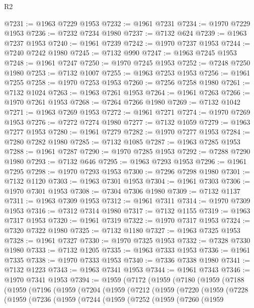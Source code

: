 \begin{lexlean}{R2}
\begin{coremodule}
@7231 := @1963 @7229 @1953
@7232 := @1961 @7231
@7234 := @1970 @7229 @1953
@7236 := @7232 @7234 @1980
@7237 := @7132 @624
@7239 := @1963 @7237 @1953
@7240 := @1961 @7239
@7242 := @1970 @7237 @1953
@7244 := @7240 @7242 @1980
@7245 := @7132 @990
@7247 := @1963 @7245 @1953
@7248 := @1961 @7247
@7250 := @1970 @7245 @1953
@7252 := @7248 @7250 @1980
@7253 := @7132 @1007
@7255 := @1963 @7253 @1953
@7256 := @1961 @7255
@7258 := @1970 @7253 @1953
@7260 := @7256 @7258 @1980
@7261 := @7132 @1024
@7263 := @1963 @7261 @1953
@7264 := @1961 @7263
@7266 := @1970 @7261 @1953
@7268 := @7264 @7266 @1980
@7269 := @7132 @1042
@7271 := @1963 @7269 @1953
@7272 := @1961 @7271
@7274 := @1970 @7269 @1953
@7276 := @7272 @7274 @1980
@7277 := @7132 @1059
@7279 := @1963 @7277 @1953
@7280 := @1961 @7279
@7282 := @1970 @7277 @1953
@7284 := @7280 @7282 @1980
@7285 := @7132 @1085
@7287 := @1963 @7285 @1953
@7288 := @1961 @7287
@7290 := @1970 @7285 @1953
@7292 := @7288 @7290 @1980
@7293 := @7132 @646
@7295 := @1963 @7293 @1953
@7296 := @1961 @7295
@7298 := @1970 @7293 @1953
@7300 := @7296 @7298 @1980
@7301 := @7132 @1120
@7303 := @1963 @7301 @1953
@7304 := @1961 @7303
@7306 := @1970 @7301 @1953
@7308 := @7304 @7306 @1980
@7309 := @7132 @1137
@7311 := @1963 @7309 @1953
@7312 := @1961 @7311
@7314 := @1970 @7309 @1953
@7316 := @7312 @7314 @1980
@7317 := @7132 @1155
@7319 := @1963 @7317 @1953
@7320 := @1961 @7319
@7322 := @1970 @7317 @1953
@7324 := @7320 @7322 @1980
@7325 := @7132 @1180
@7327 := @1963 @7325 @1953
@7328 := @1961 @7327
@7330 := @1970 @7325 @1953
@7332 := @7328 @7330 @1980
@7333 := @7132 @1205
@7335 := @1963 @7333 @1953
@7336 := @1961 @7335
@7338 := @1970 @7333 @1953
@7340 := @7336 @7338 @1980
@7341 := @7132 @1223
@7343 := @1963 @7341 @1953
@7344 := @1961 @7343
@7346 := @1970 @7341 @1953
@7394 := @1959
    (@7172
      (@1959
        (@7180
          (@1959
            (@7188
              (@1959
                (@7196
                  (@1959
                    (@7204
                      (@1959
                        (@7212
                          (@1959
                            (@7220
                              (@1959
                                (@7228
                                  (@1959
                                    (@7236
                                      (@1959
                                        (@7244
                                          (@1959
                                            (@7252
                                              (@1959
                                                (@7260
                                                  (@1959

\end{coremodule}
\end{lexlean}
